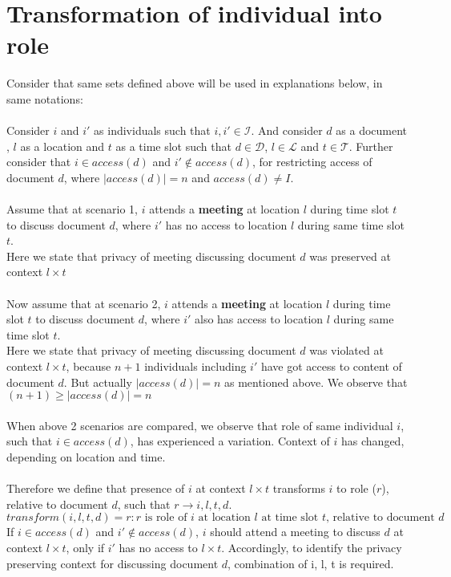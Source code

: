 \documentclass{article}
\begin{document}
\section{Transformation of individual into role}
\noindent
Consider that same sets defined above will be used in explanations below, in same notations: \\ \\
\noindent
Consider $i$ and $i'$ as individuals such that $i, i' \in \mathcal{I}$. And consider $d$ as a document , $l$ as a location and $t$ as a time slot such that $d \in \mathcal{D}$, $l \in \mathcal{L}$ and $t \in \mathcal{T}$.
Further consider that $i \in access(d)$ and $i' \notin access(d)$, for restricting access of document $d$, where $|access(d)| = n$ and $access(d) \ne I$.\\ \\
\noindent
Assume that at scenario 1, $i$ attends a \textbf{meeting} at location $l$ during time slot $t$ to discuss document $d$, where $i'$ has no access to location $l$ during same time slot $t$. \\
Here we state that privacy of meeting discussing document $d$ was preserved at context $l \times t$ \\ \\ 
\noindent
Now assume that at scenario 2, $i$ attends a \textbf{meeting} at location $l$ during time slot $t$ to discuss document $d$, where $i'$ also has access to location $l$ during same time slot $t$. \\
Here we state that privacy of meeting discussing document $d$ was violated at context $l \times t$, because $n + 1$ individuals including $i'$ have got access to content of document $d$. But actually $|access(d)| = n$ as mentioned above. We observe that $(n + 1) \geq |access(d)| = n$ \\ \\ 
\noindent
When above 2 scenarios are compared, we observe that role of same individual $i$, such that $i \in access(d)$, has experienced a variation. Context of $i$ has changed, depending on location and time. \\ \\
Therefore we define that presence of $i$ at context $l \times t$ transforms $i$ to role ($r$), relative to document $d$, such that $r \rightarrow i, l, t, d$.
\[ transform(i, l, t, d) = r : r \text{ is role of } i \text{ at location } l \text{ at time slot } t \text{, relative to document } d \] 
\noindent
If $i \in access(d)$ and $i' \notin access(d)$, $i$ should attend a meeting to discuss $d$ at context $l \times t$, only if $i'$ has no access to $l \times t$. Accordingly, to identify the privacy preserving context for discussing document $d$, combination of i, l, t is required.\\ \\
\end{document}
